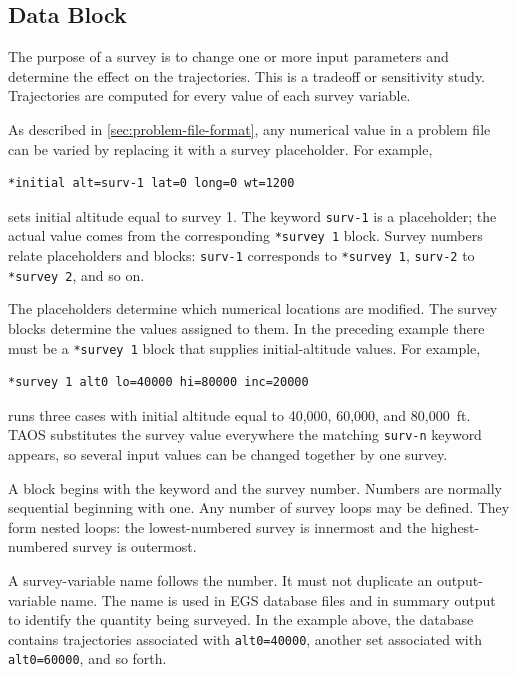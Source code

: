\subsection{ Data Block}\label{sec:block-survey}

The purpose of a survey is to change one or more input parameters and determine the
effect on the trajectories. This is a tradeoff or sensitivity study. Trajectories are
computed for every value of each survey variable.

As described in \cref{sec:problem-file-format}, any numerical value in a problem
file can be varied by replacing it with a survey placeholder. For example,

\begin{lstlisting}[style=taosmanual]
*initial alt=surv-1 lat=0 long=0 wt=1200
\end{lstlisting}

sets initial altitude equal to survey 1. The keyword \texttt{surv-1} is a placeholder;
the actual value comes from the corresponding \texttt{*survey 1} block. Survey
numbers relate placeholders and blocks: \texttt{surv-1} corresponds to
\texttt{*survey 1}, \texttt{surv-2} to \texttt{*survey 2}, and so on.

The placeholders determine which numerical locations are modified. The survey
blocks determine the values assigned to them. In the preceding example there must
be a \texttt{*survey 1} block that supplies initial-altitude values. For example,

\begin{lstlisting}[style=taosmanual]
*survey 1 alt0 lo=40000 hi=80000 inc=20000
\end{lstlisting}

runs three cases with initial altitude equal to 40,000, 60,000, and 80,000~ft. TAOS
substitutes the survey value everywhere the matching \texttt{surv-n} keyword appears,
so several input values can be changed together by one survey.


A block begins with the  keyword and the survey number.
Numbers are normally sequential beginning with one. Any number of survey loops may
be defined. They form nested loops: the lowest-numbered survey is innermost and the
highest-numbered survey is outermost.

A survey-variable name follows the number. It must not duplicate an output-variable
name. The name is used in EGS database files and in summary output to identify the
quantity being surveyed. In the example above, the database contains trajectories
associated with \texttt{alt0=40000}, another set associated with
\texttt{alt0=60000}, and so forth.


